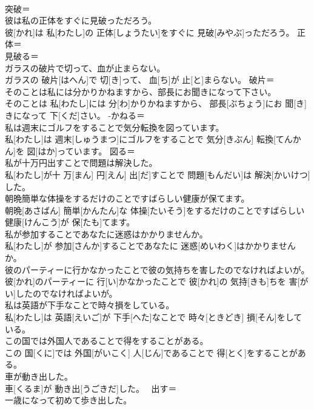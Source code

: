 \documentclass[8pt]{extreport}
\begin{document}
\begin{CJK}{UTF8}{min}
\\	突破＝ 
\\	彼は私の正体をすぐに見破っただろう。	
\\	彼[かれ]は 私[わたし]の 正体[しょうたい]をすぐに 見破[みやぶ]っただろう。	正体＝ 
\\	見破る＝ 
\\	ガラスの破片で切って、血が止まらない。	
\\	ガラスの 破片[はへん]で 切[き]って、 血[ち]が 止[と]まらない。	破片＝ 
\\	そのことは私には分かりかねますから、部長にお聞きになって下さい。	
\\	そのことは 私[わたし]には 分[わ]かりかねますから、 部長[ぶちょう]にお 聞[き]きになって 下[くだ]さい。	-かねる＝ 
\\	私は週末にゴルフをすることで気分転換を図っています。	
\\	私[わたし]は 週末[しゅうまつ]にゴルフをすることで 気分[きぶん] 転換[てんかん]を 図[はか]っています。	図る＝ 
\\	私が十万円出すことで問題は解決した。	
\\	私[わたし]が十 万[まん] 円[えん] 出[だ]すことで 問題[もんだい]は 解決[かいけつ]した。	
\\	朝晩簡単な体操をするだけのことですばらしい健康が保てます。	
\\	朝晩[あさばん] 簡単[かんたん]な 体操[たいそう]をするだけのことですばらしい 健康[けんこう]が 保[たも]てます。	
\\	私が参加することであなたに迷惑はかかりませんか。	
\\	私[わたし]が 参加[さんか]することであなたに 迷惑[めいわく]はかかりませんか。	
\\	彼のパーティーに行かなかったことで彼の気持ちを害したのでなければよいが。	
\\	彼[かれ]のパーティーに 行[い]かなかったことで 彼[かれ]の 気持[きも]ちを 害[がい]したのでなければよいが。	
\\	私は英語が下手なことで時々損をしている。	
\\	私[わたし]は 英語[えいご]が 下手[へた]なことで 時々[ときどき] 損[そん]をしている。	
\\	この国では外国人であることで得をすることがある。	
\\	この 国[くに]では 外国[がいこく] 人[じん]であることで 得[とく]をすることがある。	
\\	車が動き出した。	
\\	車[くるま]が 動き出[うごきだ]した。	~出す＝ 
\\	一歳になって初めて歩き出した。	

\end{CJK}
\end{document}
